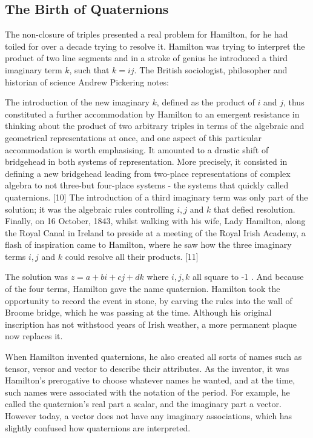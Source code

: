\documentclass[10pt]{article}
\begin{document}
\subsection{The Birth of Quaternions}
The non-closure of triples presented a real problem for Hamilton, for he had toiled for over a decade trying to resolve it. Hamilton was trying to interpret the product of two line segments and in a stroke of genius he introduced a third imaginary term $k$, such that $k=i j$. The British sociologist, philosopher and historian of science Andrew Pickering notes:

The introduction of the new imaginary $k$, defined as the product of $i$ and $j$, thus constituted a further accommodation by Hamilton to an emergent resistance in thinking about the product of two arbitrary triples in terms of the algebraic and geometrical representations at once, and one aspect of this particular accommodation is worth emphasising. It amounted to a drastic shift of bridgehead in both systems of representation. More precisely, it consisted in defining a new bridgehead leading from two-place representations of complex algebra to not three-but four-place systems - the systems that quickly called quaternions. [10] The introduction of a third imaginary term was only part of the solution; it was the algebraic rules controlling $i, j$ and $k$ that defied resolution. Finally, on 16 October, 1843, whilst walking with his wife, Lady Hamilton, along the Royal Canal in Ireland to preside at a meeting of the Royal Irish Academy, a flash of inspiration came to Hamilton, where he saw how the three imaginary terms $i, j$ and $k$ could resolve all their products. [11]

The solution was $z=a+b i+c j+d k$ where $i, j, k$ all square to -1 . And because of the four terms, Hamilton gave the name quaternion. Hamilton took the opportunity to record the event in stone, by carving the rules into the wall of Broome bridge, which he was passing at the time. Although his original inscription has not withstood years of Irish weather, a more permanent plaque now replaces it.

When Hamilton invented quaternions, he also created all sorts of names such as tensor, versor and vector to describe their attributes. As the inventor, it was Hamilton's prerogative to choose whatever names he wanted, and at the time, such names were associated with the notation of the period. For example, he called the quaternion's real part a scalar, and the imaginary part a vector. However today, a vector does not have any imaginary associations, which has slightly confused how quaternions are interpreted.
\end{document}
